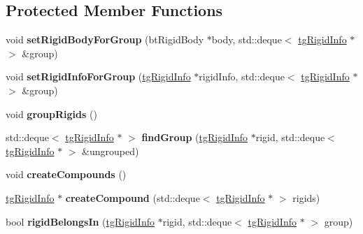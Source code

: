 \subsection*{Protected Member Functions}
\begin{DoxyCompactItemize}
\item 
\hypertarget{classtg_rigid_auto_compound_ade93a2c42a6bbe563e6440585cc0fe08}{void {\bfseries set\-Rigid\-Body\-For\-Group} (bt\-Rigid\-Body $\ast$body, std\-::deque$<$ \hyperlink{classtg_rigid_info}{tg\-Rigid\-Info} $\ast$ $>$ \&group)}\label{classtg_rigid_auto_compound_ade93a2c42a6bbe563e6440585cc0fe08}

\item 
\hypertarget{classtg_rigid_auto_compound_a891ce800ef522a454e81b2082a1f14f1}{void {\bfseries set\-Rigid\-Info\-For\-Group} (\hyperlink{classtg_rigid_info}{tg\-Rigid\-Info} $\ast$rigid\-Info, std\-::deque$<$ \hyperlink{classtg_rigid_info}{tg\-Rigid\-Info} $\ast$ $>$ \&group)}\label{classtg_rigid_auto_compound_a891ce800ef522a454e81b2082a1f14f1}

\item 
\hypertarget{classtg_rigid_auto_compound_a43eead9c5cd721a1c445639bd07bb927}{void {\bfseries group\-Rigids} ()}\label{classtg_rigid_auto_compound_a43eead9c5cd721a1c445639bd07bb927}

\item 
\hypertarget{classtg_rigid_auto_compound_a3c0dafeaf326a014625c15b9ba5d133d}{std\-::deque$<$ \hyperlink{classtg_rigid_info}{tg\-Rigid\-Info} $\ast$ $>$ {\bfseries find\-Group} (\hyperlink{classtg_rigid_info}{tg\-Rigid\-Info} $\ast$rigid, std\-::deque$<$ \hyperlink{classtg_rigid_info}{tg\-Rigid\-Info} $\ast$ $>$ \&ungrouped)}\label{classtg_rigid_auto_compound_a3c0dafeaf326a014625c15b9ba5d133d}

\item 
\hypertarget{classtg_rigid_auto_compound_ab2cfc89b1d562d1bf911c3e8f8cc5bad}{void {\bfseries create\-Compounds} ()}\label{classtg_rigid_auto_compound_ab2cfc89b1d562d1bf911c3e8f8cc5bad}

\item 
\hypertarget{classtg_rigid_auto_compound_a09a9f409e46e47d19fcc902ac8f99f58}{\hyperlink{classtg_rigid_info}{tg\-Rigid\-Info} $\ast$ {\bfseries create\-Compound} (std\-::deque$<$ \hyperlink{classtg_rigid_info}{tg\-Rigid\-Info} $\ast$ $>$ rigids)}\label{classtg_rigid_auto_compound_a09a9f409e46e47d19fcc902ac8f99f58}

\item 
\hypertarget{classtg_rigid_auto_compound_aa62a11650fbf50f28f0d29a8773121d4}{bool {\bfseries rigid\-Belongs\-In} (\hyperlink{classtg_rigid_info}{tg\-Rigid\-Info} $\ast$rigid, std\-::deque$<$ \hyperlink{classtg_rigid_info}{tg\-Rigid\-Info} $\ast$ $>$ group)}\label{classtg_rigid_auto_compound_aa62a11650fbf50f28f0d29a8773121d4}

\end{DoxyCompactItemize}
